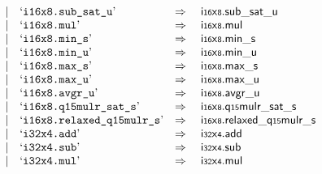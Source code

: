 $$\begin{array}[t]{@{}lrrl@{}l@{}l@{}l@{}}
& & | & \mbox{‘\texttt{i16x8.sub\_sat\_u}’} & \quad\Rightarrow\quad{} & {\mathsf{i{\scriptstyle 16}}}{\mathsf{x}}{\mathsf{{\scriptstyle 8}}} {.} {\mathsf{sub\_sat}}{\mathsf{\_}}{\mathsf{u}} \\
& & | & \mbox{‘\texttt{i16x8.mul}’} & \quad\Rightarrow\quad{} & {\mathsf{i{\scriptstyle 16}}}{\mathsf{x}}{\mathsf{{\scriptstyle 8}}} {.} \mathsf{mul} \\
& & | & \mbox{‘\texttt{i16x8.min\_s}’} & \quad\Rightarrow\quad{} & {\mathsf{i{\scriptstyle 16}}}{\mathsf{x}}{\mathsf{{\scriptstyle 8}}} {.} {\mathsf{min}}{\mathsf{\_}}{\mathsf{s}} \\
& & | & \mbox{‘\texttt{i16x8.min\_u}’} & \quad\Rightarrow\quad{} & {\mathsf{i{\scriptstyle 16}}}{\mathsf{x}}{\mathsf{{\scriptstyle 8}}} {.} {\mathsf{min}}{\mathsf{\_}}{\mathsf{u}} \\
& & | & \mbox{‘\texttt{i16x8.max\_s}’} & \quad\Rightarrow\quad{} & {\mathsf{i{\scriptstyle 16}}}{\mathsf{x}}{\mathsf{{\scriptstyle 8}}} {.} {\mathsf{max}}{\mathsf{\_}}{\mathsf{s}} \\
& & | & \mbox{‘\texttt{i16x8.max\_u}’} & \quad\Rightarrow\quad{} & {\mathsf{i{\scriptstyle 16}}}{\mathsf{x}}{\mathsf{{\scriptstyle 8}}} {.} {\mathsf{max}}{\mathsf{\_}}{\mathsf{u}} \\
& & | & \mbox{‘\texttt{i16x8.avgr\_u}’} & \quad\Rightarrow\quad{} & {\mathsf{i{\scriptstyle 16}}}{\mathsf{x}}{\mathsf{{\scriptstyle 8}}} {.} {\mathsf{avgr}}{\mathsf{\_}}{\mathsf{u}} \\
& & | & \mbox{‘\texttt{i16x8.q15mulr\_sat\_s}’} & \quad\Rightarrow\quad{} & {\mathsf{i{\scriptstyle 16}}}{\mathsf{x}}{\mathsf{{\scriptstyle 8}}} {.} {\mathsf{q{\scriptstyle 15}mulr\_sat}}{\mathsf{\_}}{\mathsf{s}} \\
& & | & \mbox{‘\texttt{i16x8.relaxed\_q15mulr\_s}’} & \quad\Rightarrow\quad{} & {\mathsf{i{\scriptstyle 16}}}{\mathsf{x}}{\mathsf{{\scriptstyle 8}}} {.} {\mathsf{relaxed\_q{\scriptstyle 15}mulr}}{\mathsf{\_}}{\mathsf{s}} \\
& & | & \mbox{‘\texttt{i32x4.add}’} & \quad\Rightarrow\quad{} & {\mathsf{i{\scriptstyle 32}}}{\mathsf{x}}{\mathsf{{\scriptstyle 4}}} {.} \mathsf{add} \\
& & | & \mbox{‘\texttt{i32x4.sub}’} & \quad\Rightarrow\quad{} & {\mathsf{i{\scriptstyle 32}}}{\mathsf{x}}{\mathsf{{\scriptstyle 4}}} {.} \mathsf{sub} \\
& & | & \mbox{‘\texttt{i32x4.mul}’} & \quad\Rightarrow\quad{} & {\mathsf{i{\scriptstyle 32}}}{\mathsf{x}}{\mathsf{{\scriptstyle 4}}} {.} \mathsf{mul} \\

\end{array}$$
